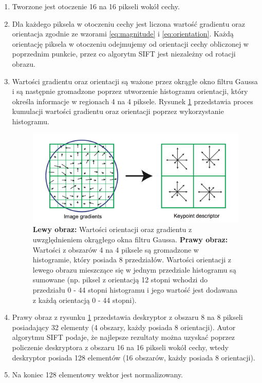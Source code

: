 \begin{enumerate}
\item Tworzone jest otoczenie 16 na 16 pikseli wokół cechy.
\item Dla każdego piksela w otoczeniu cechy jest liczona wartość gradientu oraz orientacja zgodnie ze wzorami \ref{eq:magnitude} i \ref{eq:orientation}. Każdą orientację piksela w otoczeniu odejmujemy od orientacji cechy obliczonej w poprzednim punkcie, przez co algorytm SIFT jest niezależny od rotacji obrazu.
\item Wartości gradientu oraz orientacji są ważone przez okrągłe okno filtru Gaussa i są następnie gromadzone poprzez utworzenie histogramu orientacji, który określa informacje w regionach 4 na 4 piksele. Rysunek \ref{fig:proponowane_algorytmy:descriptor} przedstawia proces kumulacji wartości gradientu oraz orientacji poprzez wykorzystanie histogramu.

\begin{figure}[H]
  \centering
  \includegraphics[width=\textwidth]{gfx/descriptor}
  \caption{\cite{Lowe:2004:DIF:993451.996342} \textbf{Lewy obraz:} Wartości orientacji oraz gradientu z uwzględnieniem okrągłego okna filtru Gaussa. \textbf{Prawy obraz:} Wartości z obszarów 4 na 4 piksele są gromadzone w histogramie, który posiada 8 przedziałów. Wartości orientacji z lewego obrazu mieszczące się w jednym przedziale histogramu są sumowane (np. piksel z orientacją 12 stopni wchodzi do przedziału 0 - 44 stopni histogramu i jego wartość jest dodawana z każdą orientacją 0 - 44 stopni).}
  \label{fig:proponowane_algorytmy:descriptor}
\end{figure}

\item Prawy obraz z rysunku \ref{fig:proponowane_algorytmy:descriptor} przedstawia deskryptor z obszaru 8 na 8 pikseli posiadający 32 elementy (4 obszary, każdy posiada 8 orientacji). Autor algorytmu SIFT podaje, że najlepsze rezultaty można uzyskać poprzez policzenie deskryptora z obszaru 16 na 16 pikseli wokół cechy, wtedy deskryptor posiada 128 elementów (16 obszarów, każdy posiada 8 orientacji).
\item Na koniec 128 elementowy wektor jest normalizowany.
\end{enumerate}

